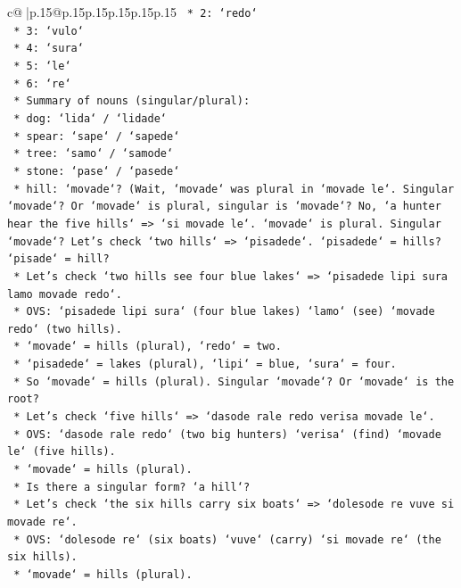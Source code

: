 \documentclass{article}
\begin{document}
{\begin{supertabular}{c@{$\;$}|p{.15\linewidth}@{}p{.15\linewidth}p{.15\linewidth}p{.15\linewidth}p{.15\linewidth}p{.15\linewidth}}
{{{\texttt{        *   2: `redo`} \\
\texttt{        *   3: `vulo`} \\
\texttt{        *   4: `sura`} \\
\texttt{        *   5: `le`} \\
\texttt{        *   6: `re`} \\
\texttt{    *   Summary of nouns (singular/plural):} \\
\texttt{        *   dog: `lida` / `lidade`} \\
\texttt{        *   spear: `sape` / `sapede`} \\
\texttt{        *   tree: `samo` / `samode`} \\
\texttt{        *   stone: `pase` / `pasede`} \\
\texttt{        *   hill: `movade`? (Wait, `movade` was plural in `movade le`. Singular `movade`? Or `movade` is plural, singular is `movade`? No, `a hunter hear the five hills` => `si movade le`. `movade` is plural. Singular `movade`? Let's check `two hills` => `pisadede`. `pisadede` = hills? `pisade` = hill?} \\
\texttt{        *   Let's check `two hills see four blue lakes` => `pisadede lipi sura lamo movade redo`.} \\
\texttt{        *   OVS: `pisadede lipi sura` (four blue lakes) `lamo` (see) `movade redo` (two hills).} \\
\texttt{        *   `movade` = hills (plural), `redo` = two.} \\
\texttt{        *   `pisadede` = lakes (plural), `lipi` = blue, `sura` = four.} \\
\texttt{        *   So `movade` = hills (plural). Singular `movade`? Or `movade` is the root?} \\
\texttt{        *   Let's check `five hills` => `dasode rale redo verisa movade le`.} \\
\texttt{        *   OVS: `dasode rale redo` (two big hunters) `verisa` (find) `movade le` (five hills).} \\
\texttt{        *   `movade` = hills (plural).} \\
\texttt{        *   Is there a singular form? `a hill`?} \\
\texttt{        *   Let's check `the six hills carry six boats` => `dolesode re vuve si movade re`.} \\
\texttt{        *   OVS: `dolesode re` (six boats) `vuve` (carry) `si movade re` (the six hills).} \\
\texttt{        *   `movade` = hills (plural).} \\
}}}
\end{supertabular}}
\end{document}
